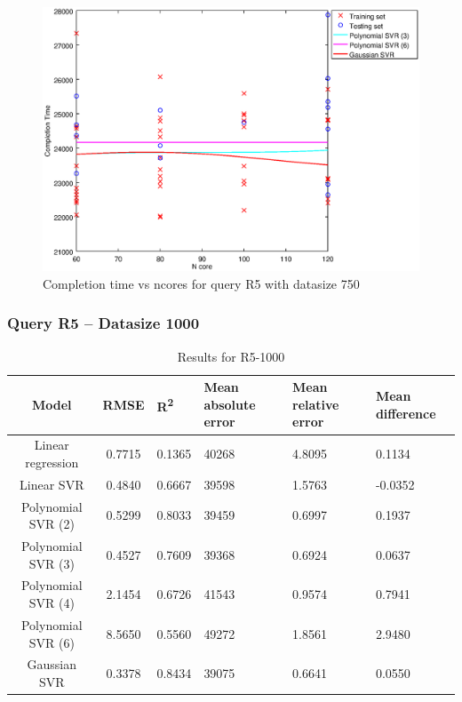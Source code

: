 \documentclass[a4paper,11pt]{article}
\begin{document}
\begin {figure}[hbtp]
\centering
\includegraphics[width=\textwidth]{output/R5_750_LINEAR_NCORE/plot_R5_750_bestmodels.eps}
\caption{Completion time vs ncores for query R5 with datasize 750}
\label{fig:all_linear_R5_750}
\end {figure}

\newpage
\subsubsection{Query R5 -- Datasize 1000}
\begin{table}[H]
	\centering
	\begin{adjustbox}{center}
		\begin{tabular}{c | c M{1.2cm} M{2.5cm} M{2.5cm} M{1.8cm}}
			Model & RMSE & R\textsuperscript{2} & Mean absolute error & Mean relative error & Mean difference \tabularnewline
			\hline
			Linear regression & 0.7715 & 0.1365 &  40268 & 4.8095 & 0.1134 \\
			Linear SVR & 0.4840 & 0.6667 &  39598 & 1.5763 & -0.0352 \\
			Polynomial SVR (2) & 0.5299 & 0.8033 &  39459 & 0.6997 & 0.1937 \\
			Polynomial SVR (3) & 0.4527 & 0.7609 &  39368 & 0.6924 & 0.0637 \\
			Polynomial SVR (4) & 2.1454 & 0.6726 &  41543 & 0.9574 & 0.7941 \\
			Polynomial SVR (6) & 8.5650 & 0.5560 &  49272 & 1.8561 & 2.9480 \\
			Gaussian SVR & 0.3378 & 0.8434 &  39075 & 0.6641 & 0.0550 \\
		\end{tabular}
	\end{adjustbox}
	\\
	\caption{Results for R5-1000}
	\label{fig:all_linear_R5_1000}
\end{table}
\end{document}
